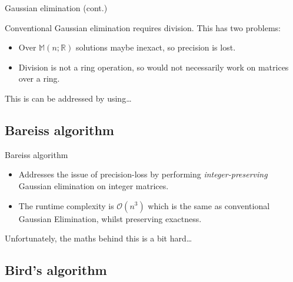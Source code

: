 \documentclass[handout]{beamer}
\begin{document}
\begin{frame}{Gaussian elimination (cont.)}

    Conventional Gaussian elimination requires division.
    This has two problems:
    \begin{itemize}
        \item Over $\mathbb{M}(n; \mathbb{R})$ solutions maybe inexact, so precision is lost.
        \item Division is not a ring operation,
            so would not necessarily work on matrices over a ring.
    \end{itemize}

    \pause{}

    This is can be addressed by using\dots

\end{frame}

\subsection{Bareiss algorithm}

\begin{frame}{Bareiss algorithm}

    \begin{itemize}

        \item Addresses the issue of precision-loss by performing \emph{integer-preserving}
            Gaussian elimination on integer matrices.

        \item The runtime complexity is $\mathcal{O}(n^3)$ which is the same as conventional
            Gaussian Elimination, whilst preserving exactness.

    \end{itemize}

    \pause{}

    Unfortunately, the maths behind this is a bit hard\dots

\end{frame}

\subsection{Bird's algorithm}
\end{document}
